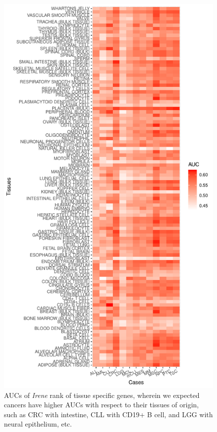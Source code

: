 \documentclass[a4paper,12pt]{article}
\begin{document}
\begin{figure}[!htb]
\centering
\includegraphics[scale=0.78]{figs/tissueAUC.pdf}
\caption{AUCs of {\em Irene} rank of tissue specific genes, wherein we expected cancers have higher AUCs with respect to their tissues of origin, such as CRC with intestine, CLL with CD19+ B cell, and LGG with neural epithelium, etc. }
\label{fig:rnd}
\end{figure}
\end{document}
